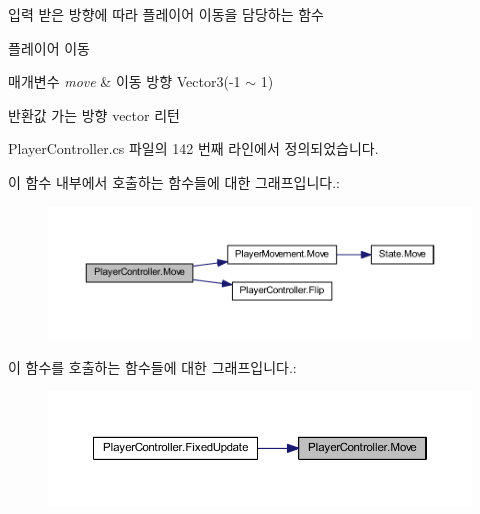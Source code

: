 입력 받은 방향에 따라 플레이어 이동을 담당하는 함수 

플레이어 이동 
\begin{DoxyParams}{매개변수}
{\em move} & 이동 방향 Vector3(-\/1 $\sim$ 1) \\
\hline
\end{DoxyParams}
\begin{DoxyReturn}{반환값}
가는 방향 vector 리턴 
\end{DoxyReturn}


Player\+Controller.\+cs 파일의 142 번째 라인에서 정의되었습니다.


\begin{DoxyCode}{0}

\end{DoxyCode}
이 함수 내부에서 호출하는 함수들에 대한 그래프입니다.\+:\nopagebreak
\begin{figure}[H]
\begin{center}
\leavevmode
\includegraphics[width=350pt]{dc/dde/class_player_controller_a50157884365897164379b8bad7ee4722_cgraph}
\end{center}
\end{figure}
이 함수를 호출하는 함수들에 대한 그래프입니다.\+:\nopagebreak
\begin{figure}[H]
\begin{center}
\leavevmode
\includegraphics[width=350pt]{dc/dde/class_player_controller_a50157884365897164379b8bad7ee4722_icgraph}
\end{center}
\end{figure}
